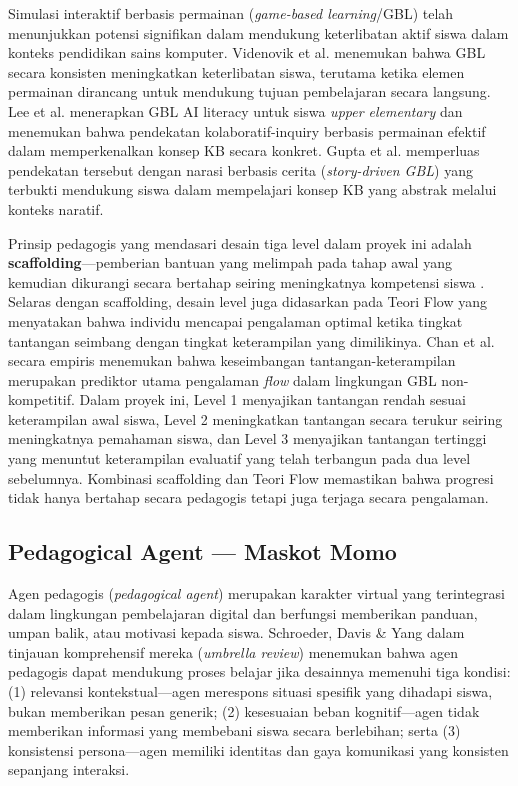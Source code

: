 \documentclass[12pt,a4paper,oneside,openany]{report}
\begin{document}
Simulasi interaktif berbasis permainan (\textit{game-based learning}/GBL) telah menunjukkan potensi signifikan dalam mendukung keterlibatan aktif siswa dalam konteks pendidikan sains komputer. Videnovik et al. \cite{ref6} menemukan bahwa GBL secara konsisten meningkatkan keterlibatan siswa, terutama ketika elemen permainan dirancang untuk mendukung tujuan pembelajaran secara langsung. Lee et al. \cite{ref13} menerapkan GBL AI literacy untuk siswa \textit{upper elementary} dan menemukan bahwa pendekatan kolaboratif-inquiry berbasis permainan efektif dalam memperkenalkan konsep KB secara konkret. Gupta et al. \cite{ref14} memperluas pendekatan tersebut dengan narasi berbasis cerita (\textit{story-driven GBL}) yang terbukti mendukung siswa dalam mempelajari konsep KB yang abstrak melalui konteks naratif.

Prinsip pedagogis yang mendasari desain tiga level dalam proyek ini adalah \textbf{scaffolding}---pemberian bantuan yang melimpah pada tahap awal yang kemudian dikurangi secara bertahap seiring meningkatnya kompetensi siswa \cite{ref6}. Selaras dengan scaffolding, desain level juga didasarkan pada Teori Flow yang menyatakan bahwa individu mencapai pengalaman optimal ketika tingkat tantangan seimbang dengan tingkat keterampilan yang dimilikinya. Chan et al. \cite{ref7} secara empiris menemukan bahwa keseimbangan tantangan-keterampilan merupakan prediktor utama pengalaman \textit{flow} dalam lingkungan GBL non-kompetitif. Dalam proyek ini, Level 1 menyajikan tantangan rendah sesuai keterampilan awal siswa, Level 2 meningkatkan tantangan secara terukur seiring meningkatnya pemahaman siswa, dan Level 3 menyajikan tantangan tertinggi yang menuntut keterampilan evaluatif yang telah terbangun pada dua level sebelumnya. Kombinasi scaffolding dan Teori Flow memastikan bahwa progresi tidak hanya bertahap secara pedagogis tetapi juga terjaga secara pengalaman.

\subsection{Pedagogical Agent --- Maskot Momo}
\label{subsec:pedagogical-agent}

Agen pedagogis (\textit{pedagogical agent}) merupakan karakter virtual yang terintegrasi dalam lingkungan pembelajaran digital dan berfungsi memberikan panduan, umpan balik, atau motivasi kepada siswa. Schroeder, Davis \& Yang \cite{ref9} dalam tinjauan komprehensif mereka (\textit{umbrella review}) menemukan bahwa agen pedagogis dapat mendukung proses belajar jika desainnya memenuhi tiga kondisi: (1) relevansi kontekstual---agen merespons situasi spesifik yang dihadapi siswa, bukan memberikan pesan generik; (2) kesesuaian beban kognitif---agen tidak memberikan informasi yang membebani siswa secara berlebihan; serta (3) konsistensi persona---agen memiliki identitas dan gaya komunikasi yang konsisten sepanjang interaksi.
\end{document}
